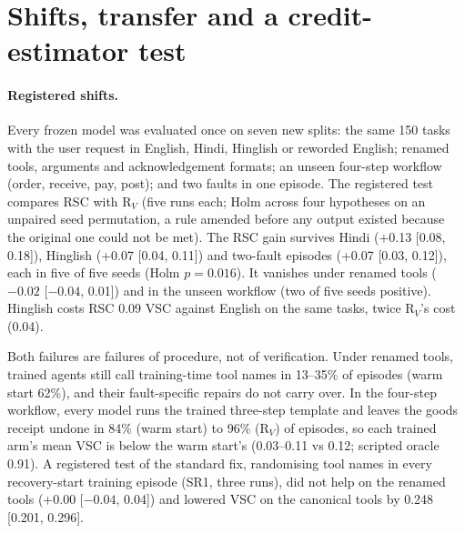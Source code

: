 \documentclass[11pt]{article}
\newcommand{\RV}{R$_V$}
\begin{document}
\begin{table}[t]
\centering
\resizebox{\columnwidth}{!}{}
\caption{Registered S3 contrasts: seed-averaged difference [95\% task CI]. Five seeds against \RV{}; three (addendum 1) and five (addendum 2, unpaired seed permutation with Holm) against the class-matched control.}
\label{tab:s3}
\end{table}

\begin{table}[t]
\centering
\resizebox{\columnwidth}{!}{}
\caption{VSC on full-episode partial and duplicate tasks by workflow (seeds 0--2 pooled).}
\label{tab:wf}
\end{table}

\section{Shifts, transfer and a credit-estimator test}\label{sec:shift}

\paragraph{Registered shifts.} Every frozen model was evaluated once on seven new splits: the same 150 tasks with the user request in English, Hindi, Hinglish or reworded English; renamed tools, arguments and acknowledgement formats; an unseen four-step workflow (order, receive, pay, post); and two faults in one episode. The registered test compares RSC with \RV{} (five runs each; Holm across four hypotheses on an unpaired seed permutation, a rule amended before any output existed because the original one could not be met). The RSC gain survives Hindi (+0.13 [0.08, 0.18]), Hinglish (+0.07 [0.04, 0.11]) and two-fault episodes (+0.07 [0.03, 0.12]), each in five of five seeds (Holm $p=0.016$). It vanishes under renamed tools ($-0.02$ [$-0.04$, 0.01]) and in the unseen workflow (two of five seeds positive). Hinglish costs RSC 0.09 VSC against English on the same tasks, twice \RV{}'s cost (0.04).

Both failures are failures of procedure, not of verification. Under renamed tools, trained agents still call training-time tool names in 13--35\% of episodes (warm start 62\%), and their fault-specific repairs do not carry over. In the four-step workflow, every model runs the trained three-step template and leaves the goods receipt undone in 84\% (warm start) to 96\% (\RV{}) of episodes, so each trained arm's mean VSC is below the warm start's (0.03--0.11 vs 0.12; scripted oracle 0.91). A registered test of the standard fix, randomising tool names in every recovery-start training episode (SR1, three runs), did not help on the renamed tools (+0.00 [$-0.04$, 0.04]) and lowered VSC on the canonical tools by 0.248 [0.201, 0.296].
\end{document}
